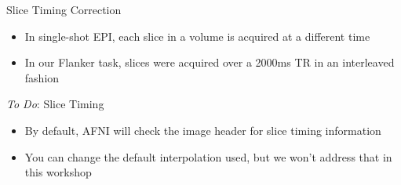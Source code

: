 \documentclass[t,12pt]{beamer}
\begin{document}
\begin{frame}{Slice Timing Correction}
\vspace{10pt}
\begin{itemize}
\setlength\itemsep{1em}
\item In single-shot EPI, each slice in a volume is acquired at a different time
\item In our Flanker task, slices were acquired over a 2000ms TR in an interleaved fashion
\end{itemize}
\end{frame}

\begin{frame}{\emph{To Do}: Slice Timing}
\vspace{10pt}
\begin{itemize}
\setlength\itemsep{1em}
\item By default, AFNI will check the image header for slice timing information
\item You can change the default interpolation used, but we won't address that in this workshop 
\end{itemize}
\end{frame}
\end{document}
